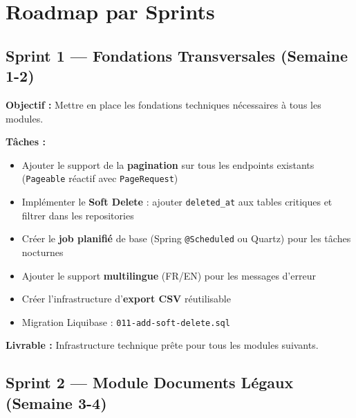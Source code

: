 \documentclass[12pt,a4paper]{report}
\begin{document}
\section{Roadmap par Sprints}

\subsection{Sprint 1 — Fondations Transversales (Semaine 1-2)}

\begin{tcolorbox}[colback=fleetdark!5, colframe=fleetdark, title={\bfseries Sprint 1 — Prérequis Techniques}]
\textbf{Objectif :} Mettre en place les fondations techniques nécessaires à tous les modules.

\textbf{Tâches :}
\begin{itemize}[leftmargin=1.5cm]
  \item Ajouter le support de la \textbf{pagination} sur tous les endpoints existants (\texttt{Pageable} réactif avec \texttt{PageRequest})
  \item Implémenter le \textbf{Soft Delete} : ajouter \texttt{deleted\_at} aux tables critiques et filtrer dans les repositories
  \item Créer le \textbf{job planifié} de base (Spring \texttt{@Scheduled} ou Quartz) pour les tâches nocturnes
  \item Ajouter le support \textbf{multilingue} (FR/EN) pour les messages d'erreur
  \item Créer l'infrastructure d'\textbf{export CSV} réutilisable
  \item Migration Liquibase : \texttt{011-add-soft-delete.sql}
\end{itemize}

\textbf{Livrable :} Infrastructure technique prête pour tous les modules suivants.
\end{tcolorbox}

\subsection{Sprint 2 — Module Documents Légaux (Semaine 3-4)}
\end{document}
